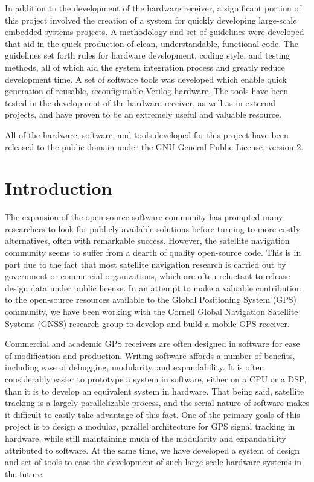 \documentclass[12pt]{article}
\begin{document}
In addition to the development of the hardware receiver, a significant portion of this project involved the creation of a system for quickly developing large-scale embedded systems projects. A methodology and set of guidelines were developed that aid in the quick production of clean, understandable, functional code. The guidelines set forth rules for hardware development, coding style, and testing methods, all of which aid the system integration process and greatly reduce development time.  A set of software tools was developed which enable quick generation of reusable, reconfigurable Verilog hardware. The tools have been tested in the development of the hardware receiver, as well as in external projects, and have proven to be an extremely useful and valuable resource.

All of the hardware, software, and tools developed for this project have been released to the public domain under the GNU General Public License, version 2.

\section{Introduction}
The expansion of the open-source software community has prompted many researchers to look for publicly available solutions before turning to more costly alternatives, often with remarkable success. However, the satellite navigation community seems to suffer from a dearth of quality open-source code. This is in part due to the fact that most satellite navigation research is carried out by government or commercial organizations, which are often reluctant to release design data under public license. In an attempt to make a valuable contribution to the open-source resources available to the Global Positioning System (GPS) community, we have been working with the Cornell Global Navigation Satellite Systems (GNSS) research group to develop and build a mobile GPS receiver.

Commercial and academic GPS receivers are often designed in software for ease of modification and production. Writing software affords a number of benefits, including ease of debugging, modularity, and expandability. It is often considerably easier to prototype a system in software, either on a CPU or a DSP, than it is to develop an equivalent system in hardware. That being said, satellite tracking is a largely parallelizable process, and the serial nature of software makes it difficult to easily take advantage of this fact. One of the primary goals of this project is to design a modular, parallel architecture for GPS signal tracking in hardware, while still maintaining much of the modularity and expandability attributed to software. At the same time, we have developed a system of design and set of tools to ease the development of such large-scale hardware systems in the future.
\end{document}

